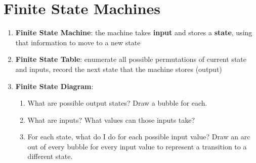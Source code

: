 \documentclass{article}
\begin{document}
\section{Finite State Machines}
\begin{enumerate}
    \item \textbf{Finite State Machine}: the machine takes \textbf{input} and stores a \textbf{state}, using that information to move to a new state
    \item \textbf{Finite State Table}: enumerate all possible permutations of current state and inputs, record the next state that the machine stores (output)
    \item \textbf{Finite State Diagram}:
    \begin{enumerate}
        \item What are possible output states? Draw a bubble for each.
        \item What are inputs? What values can those inputs take?
        \item For each state, what do I do for each possible input value? Draw an arc out of every bubble for every input value to represent a transition to a different state.
    \end{enumerate}
\end{enumerate}
\end{document}
